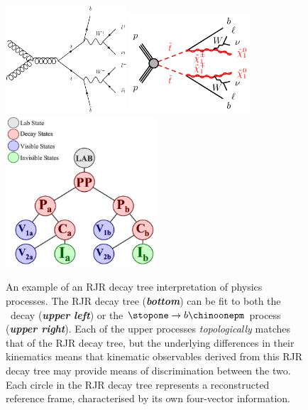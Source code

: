 \begin{figure}[!htb]
    \begin{center}
        \includegraphics[width=0.4\textwidth]{figures/search_stop2l/strategy/fgraph_ttbar}
        \includegraphics[width=0.4\textwidth]{figures/search_stop2l/strategy/fgraph_stop_bCN}
        \includegraphics[width=0.5\textwidth]{figures/search_stop2l/strategy/RJRtree_generic_PPviaC}
        \caption{
            An example of an RJR decay tree interpretation of physics processes.
            The RJR decay tree (\textit{\textbf{bottom}}) can be fit to both the \ttbar~decay
            (\textit{\textbf{upper left}}) or the $\stopone \rightarrow b \chinoonepm$ process (\textit{\textbf{upper right}}).
            Each of the upper processes \textit{topologically} matches that of the RJR decay tree, but
            the underlying differences in their kinematics means that kinematic observables derived
            from this RJR decay tree may provide means of discrimination between the two.
            Each circle in the RJR decay tree represents a reconstructed reference frame,
            characterised by its own four-vector information.
        }
        \label{fig:rjr_ttbar_bcn}
    \end{center}
\end{figure}

